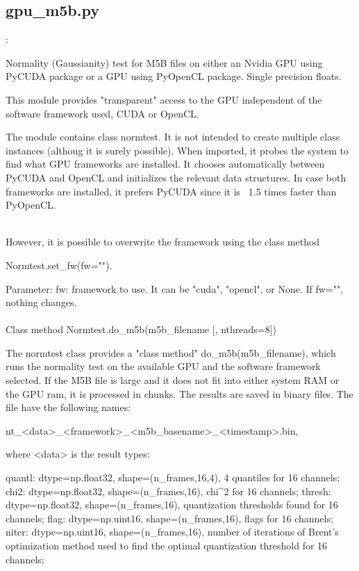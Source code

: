 \documentclass[letterpaper,twoside,12pt]{article}
\begin{document}
\subsection{gpu\_m5b.py}:

Normality (Gaussianity) test for M5B files on either an Nvidia GPU using PyCUDA
package or a GPU using PyOpenCL package. Single precision floats.

This module provides "transparent" access to the GPU independent of the
software framework used, CUDA or OpenCL.

The module contains class normtest. It is not intended to create multiple
class instances (althoug it is surely possible). When imported, it 
probes the system to find what GPU frameworks are installed. It chooses
automatically between PyCUDA and OpenCL and initializes the relevant 
data structures. In case both frameworks are installed, it prefers
PyCUDA since it is ~1.5 times faster than PyOpenCL.


 \\
However, it is possible to overwrite the framework using the class method

Normtest.set_fw(fw="").

Parameter:
    fw: framework to use. It can be "cuda", "opencl", or None.
        If fw="", nothing changes. \\
\\

    Class method Normtest.do_m5b(m5b_filename [, nthreads=8])

The normtest class provides a "class method" do_m5b(m5b_filename),
which runs the normality test on the available GPU and the software
framework selected. If the M5B file is large and it does not fit into either
system RAM or the GPU ram, it is processed in chunks. The results are saved 
in binary files.  The file have the following names:

    nt_<data>_<framework>_<m5b_basename>_<timestamp>.bin,

where <data> is the result types:

quantl: dtype=np.float32, shape=(n_frames,16,4), 4 quantiles for 16 channels;
chi2:   dtype=np.float32, shape=(n_frames,16), chi^2 for 16 channels;
thresh: dtype=np.float32, shape=(n_frames,16), quantization thresholds found
        for 16 channels;
flag:   dtype=np.uint16, shape=(n_frames,16), flags for 16 channels; 
niter:  dtype=np.uint16, shape=(n_frames,16), number of iterations of Brent's
        optimization method used to find the optimal quantization threshold
        for 16 channels;
\end{document}
